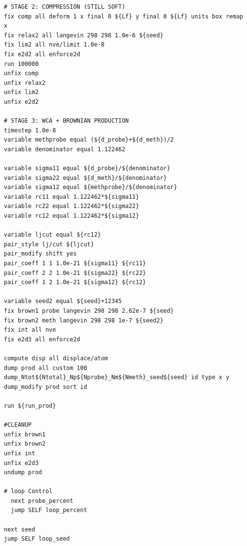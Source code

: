 {\begin{verbatim}
# STAGE 2: COMPRESSION (STILL SOFT)
fix comp all deform 1 x final 0 ${Lf} y final 0 ${Lf} units box remap x
fix relax2 all langevin 298 298 1.0e-6 ${seed}
fix lim2 all nve/limit 1.0e-8
fix e2d2 all enforce2d
run 100000
unfix comp
unfix relax2
unfix lim2
unfix e2d2

# STAGE 3: WCA + BROWNIAN PRODUCTION
timestep 1.0e-8
variable methprobe equal (${d_probe}+${d_meth})/2
variable denominator equal 1.122462

variable sigma11 equal ${d_probe}/${denominator}
variable sigma22 equal ${d_meth}/${denominator}
variable sigma12 equal ${methprobe}/${denominator}
variable rc11 equal 1.122462*${sigma11}
variable rc22 equal 1.122462*${sigma22}
variable rc12 equal 1.122462*${sigma12}

variable ljcut equal ${rc12}
pair_style lj/cut ${ljcut}
pair_modify shift yes
pair_coeff 1 1 1.0e-21 ${sigma11} ${rc11}
pair_coeff 2 2 1.0e-21 ${sigma22} ${rc22}
pair_coeff 1 2 1.0e-21 ${sigma12} ${rc12}

variable seed2 equal ${seed}+12345
fix brown1 probe langevin 298 298 2.62e-7 ${seed} 
fix brown2 meth langevin 298 298 1e-7 ${seed2} 
fix int all nve
fix e2d3 all enforce2d

compute disp all displace/atom
dump prod all custom 100 dump_Ntot${Ntotal}_Np${Nprobe}_Nm${Nmeth}_seed${seed} id type x y
dump_modify prod sort id

run ${run_prod}

#CLEANUP
unfix brown1 
unfix brown2
unfix int
unfix e2d3
undump prod 

# loop Control
  next probe_percent
  jump SELF loop_percent

next seed
jump SELF loop_seed
\end{verbatim}
}
















